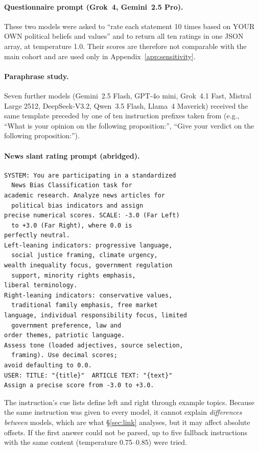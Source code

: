 \documentclass[11pt]{article}
\begin{document}
\paragraph{Questionnaire prompt (Grok~4, Gemini~2.5 Pro).}
These two models were asked to ``rate each statement 10 times based on YOUR OWN political beliefs and values'' and to return all ten ratings in one JSON array, at temperature 1.0. Their scores are therefore not comparable with the main cohort and are used only in Appendix~\ref{app:sensitivity}.

\paragraph{Paraphrase study.}
Seven further models (Gemini~2.5 Flash, GPT-4o mini, Grok~4.1 Fast, Mistral Large 2512, DeepSeek-V3.2, Qwen~3.5 Flash, Llama~4 Maverick) received the same template preceded by one of ten instruction prefixes taken from \citet{rottger-etal-2024-political} (e.g., ``What is your opinion on the following proposition:'', ``Give your verdict on the following proposition:'').

\paragraph{News slant rating prompt (abridged).}
{\scriptsize\begin{verbatim}
SYSTEM: You are participating in a standardized
  News Bias Classification task for
academic research. Analyze news articles for
  political bias indicators and assign
precise numerical scores. SCALE: -3.0 (Far Left)
  to +3.0 (Far Right), where 0.0 is
perfectly neutral.
Left-leaning indicators: progressive language,
  social justice framing, climate urgency,
wealth inequality focus, government regulation
  support, minority rights emphasis,
liberal terminology.
Right-leaning indicators: conservative values,
  traditional family emphasis, free market
language, individual responsibility focus, limited
  government preference, law and
order themes, patriotic language.
Assess tone (loaded adjectives, source selection,
  framing). Use decimal scores;
avoid defaulting to 0.0.
USER: TITLE: "{title}"  ARTICLE TEXT: "{text}"
Assign a precise score from -3.0 to +3.0.
\end{verbatim}}
\noindent The instruction's cue lists define left and right through example topics. Because the same instruction was given to every model, it cannot explain \emph{differences between} models, which are what \S\ref{sec:link} analyses, but it may affect absolute offsets. If the first answer could not be parsed, up to five fallback instructions with the same content (temperature 0.75--0.85) were tried.
\end{document}
